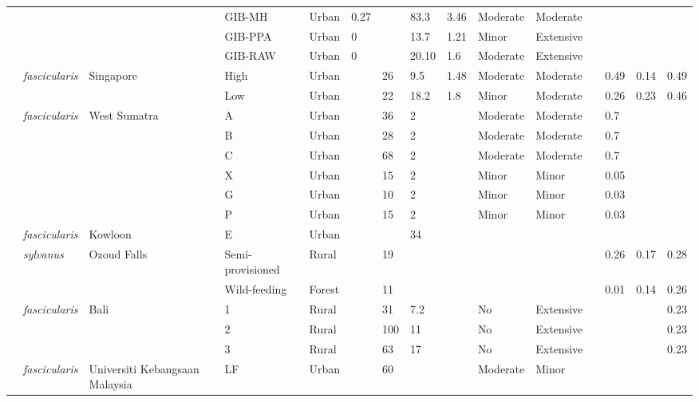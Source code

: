 \documentclass{../../../coursework}
\begin{document}
\begin{landscape}
\begin{longtabu}{X[L,2]X[1.1]XX[1.25]XXXXXXXX[0.75]X[0.5]XX}
            &  &  & GIB-MH & Urban & 0.27 &  & 83.3 & 3.46 & Moderate & Moderate &  &  &  &  \\
            &  &  & GIB-PPA & Urban & 0 &  & 13.7 & 1.21 & Minor & Extensive &  &  &  &  \\
            &  &  & GIB-RAW & Urban & 0 &  & 20.10 & 1.6 & Moderate & Extensive &  &  &  &  \\
         \textcite{Sha13} & \textit{fascicularis} & Singapore & High & Urban &  & 26 & 9.5 & 1.48 & Moderate & Moderate &  & 0.49 & 0.14 & 0.49 \\
            &  &  & Low & Urban &  & 22 & 18.2 & 1.8 & Minor & Moderate &  & 0.26 & 0.23 & 0.46 \\
         \textcite{Ilh17} & \textit{fascicularis} & West Sumatra & A & Urban &  & 36 & 2 &  & Moderate & Moderate &  & 0.7 &  &  \\
            &  &  & B & Urban &  & 28 & 2 &  & Moderate & Moderate &  & 0.7 &  &  \\
            &  &  & C & Urban &  & 68 & 2 &  & Moderate & Moderate &  & 0.7 &  &  \\
            &  &  & X & Urban &  & 15 & 2 &  & Minor & Minor &  & 0.05 &  &  \\
            &  &  & G & Urban &  & 10 & 2 &  & Minor & Minor &  & 0.03 &  &  \\
            &  &  & P & Urban &  & 15 & 2 &  & Minor & Minor &  & 0.03 &  &  \\
         \textcite{Won94} & \textit{fascicularis} & Kowloon & E & Urban &  &  & 34 &  &  &  &  &  &  &  \\
         \textcite{ElA12} & \textit{sylvanus} & Ozoud Falls & Semi-provisioned & Rural &  & 19 &  &  &  &  &  & 0.26 & 0.17 & 0.28 \\
            &  &  & Wild-feeding & Forest &  & 11 &  &  &  &  &  & 0.01 & 0.14 & 0.26 \\
         \textcite{Fue11} & \textit{fascicularis} & Bali & 1 & Rural &  & 31 & 7.2 &  & No & Extensive &  &  &  & 0.23 \\
            &  &  & 2 & Rural &  & 100 & 11 &  & No & Extensive &  &  &  & 0.23 \\
            &  &  & 3 & Rural &  & 63 & 17 &  & No & Extensive &  &  &  & 0.23 \\
         \textcite{MdZain2011} & \textit{fascicularis} & Universiti Kebangsaan Malaysia & LF & Urban &  & 60 &  &  & Moderate & Minor &  &  &  &  \\

\end{longtabu}
\end{landscape}
\end{document}
